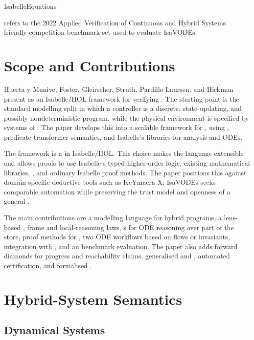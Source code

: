 \documentclass[hidelinks]{article}
\begin{document}
\begin{smodule}[title={IsaVODEs: Interactive Verification of Cyber-Physical Systems at Scale}]{IsabelleEquations}
\begin{sdefinition}[for=ARCH22]
     refers to the 2022 Applied Verification of Continuous and Hybrid Systems friendly competition benchmark set used to evaluate IsaVODEs.
\end{sdefinition}

\section{Scope and Contributions}

Huerta y Munive, Foster, Gleirscher, Struth, Pardillo Laursen, and Hickman present  as an Isabelle/HOL framework for verifying .
The starting point is the standard modelling split in which a controller is a discrete, state-updating, and possibly nondeterministic program, while the physical environment is specified by systems of .
The paper develops this into a scalable  framework for , using , predicate-transformer semantics, and Isabelle's libraries for analysis and ODEs.

The framework is a  in Isabelle/HOL.
This choice makes the language extensible and allows proofs to use Isabelle's typed higher-order logic, existing mathematical libraries, , and ordinary Isabelle proof methods.
The paper positions this against domain-specific deductive tools such as KeYmaera X: IsaVODEs seeks comparable automation while preserving the trust model and openness of a general .

The main contributions are a modelling language for hybrid programs, a lens-based , frame and local-reasoning laws, s for ODE reasoning over part of the store, proof methods for , two ODE workflows based on flows or invariants, integration with , and an  benchmark evaluation.
The paper also adds forward diamonds for progress and reachability claims, generalised  and , automated  certification, and formalised .

\section{Hybrid-System Semantics}

\subsection{Dynamical Systems}


\end{smodule}
\end{document}
